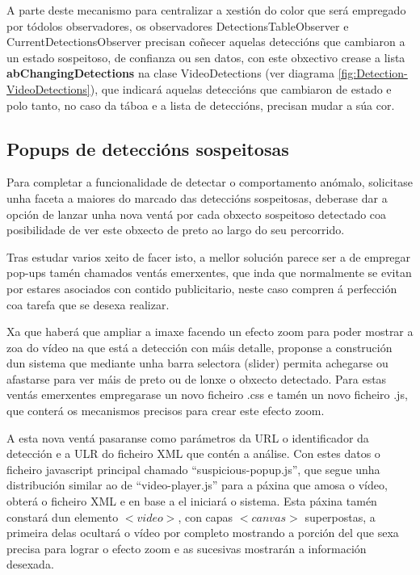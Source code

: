     A parte deste mecanismo para centralizar a xestión do color que será empregado por tódolos 
    observadores, os observadores DetectionsTableObserver e CurrentDetectionsObserver precisan 
    coñecer aquelas deteccións que cambiaron a un estado sospeitoso, de confianza ou sen datos,
    con este obxectivo crease a lista \textbf{abChangingDetections} na clase VideoDetections
    (ver diagrama \ref{fig:Detection-VideoDetections}), que indicará aquelas
    deteccións que cambiaron de estado e polo tanto, no caso da táboa e a lista de deteccións, 
    precisan mudar a súa cor.
    
    \subsection{Popups de deteccións sospeitosas}

        Para completar a funcionalidade de detectar o comportamento anómalo, solicitase unha faceta a 
        maiores do marcado das deteccións sospeitosas, deberase dar a opción de lanzar unha nova ventá
        por cada obxecto sospeitoso detectado coa posibilidade de ver este obxecto de preto ao largo do
        seu percorrido.
        
        Tras estudar varios xeito de facer isto, a mellor solución parece ser a de empregar pop-ups 
        tamén chamados ventás emerxentes, que inda que normalmente se evitan por estares asociados 
        con contido publicitario, neste caso compren á perfección coa tarefa que se desexa realizar.
        
        Xa que haberá que ampliar a imaxe facendo un efecto zoom para poder mostrar a zoa do vídeo na
        que está a detección con máis detalle, proponse a construción dun sistema que mediante unha
        barra selectora (slider) permita achegarse ou afastarse para ver máis de preto ou de lonxe o 
        obxecto detectado. Para estas ventás emerxentes empregarase un novo ficheiro .css e tamén un 
        novo ficheiro .js, que conterá os mecanismos precisos para crear este efecto zoom.
        
        A esta nova ventá pasaranse como parámetros da URL o identificador da detección e a ULR do 
        ficheiro XML que contén a análise. Con estes datos o ficheiro javascript principal chamado
        ``suspicious-popup.js'', que segue unha distribución similar ao de ``video-player.js'' para a páxina
        que amosa o vídeo, obterá o ficheiro XML e en base a el iniciará o sistema. Esta
        páxina tamén constará dun elemento $<video>$, con capas $<canvas>$ superpostas, a primeira delas 
        ocultará o vídeo por completo mostrando a porción del que sexa precisa para lograr o efecto 
        zoom e as sucesivas mostrarán a información desexada.
        
